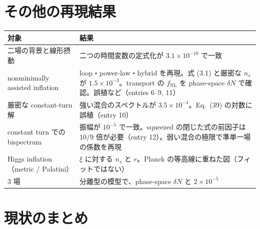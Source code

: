 \documentclass[a4paper,11pt]{ltjsarticle}
\newcommand{\fnl}{f_{\mathrm{NL}}}
\begin{document}
\section{その他の再現結果}

\begin{center}
\small
\begin{tabular}{p{4.2cm}p{9.4cm}}
\toprule
対象 & 結果 \\
\midrule
二場の背景と線形摂動 & 二つの時間変数の定式化が $3.1\times10^{-10}$ で一致 \\
nonminimally assisted inflation\cite{HKKPT2023} & loop・power-law・hybrid を再現。式 (3.1) と厳密な $n_s$ が $1.5\times10^{-3}$。transport の $\fnl$ を phase-space $\delta N$ で確認。誤植など（entries 6--9, 11） \\
厳密な constant-turn 解\cite{HMPS2026} & 強い混合のスペクトルが $3.5\times10^{-4}$。Eq.~(39) の対数に誤植（entry 10） \\
constant turn での bispectrum\cite{HMPS2026b} & 振幅が $10^{-5}$ で一致。squeezed の閉じた式の前因子は $10/9$ 倍が必要（entry 12）。弱い混合の極限で準単一場\cite{ChenWang2010}の係数を再現 \\
Higgs inflation\cite{BezrukovShaposhnikov2008,BauerDemir2008}（metric / Palatini） & $\xi$ に対する $n_s$ と $r$。Planck\cite{Planck2018X} の等高線に重ねた図（フィットではない） \\
3 場 & 分離型の模型\cite{BattefeldEasther2007}で、phase-space $\delta N$ と $2\times10^{-5}$ \\
\bottomrule
\end{tabular}
\end{center}

\section{現状のまとめ}
\end{document}
